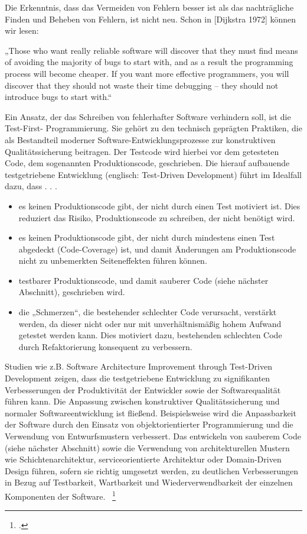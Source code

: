 Die Erkenntnis, dass das Vermeiden von Fehlern besser ist als das nachträgliche Finden
und Beheben von Fehlern, ist nicht neu. Schon in [Dijkstra 1972] können wir lesen:

„Those who want really reliable software will discover that they must find means of
avoiding the majority of bugs to start with, and as a result the programming process
will become cheaper. If you want more effective programmers, you will discover that
they should not waste their time debugging – they should not introduce bugs to start
with.“

Ein Ansatz, der das Schreiben von fehlerhafter Software verhindern soll, ist die Test-First-
Programmierung. Sie gehört zu den technisch geprägten Praktiken, die als Bestandteil moderner 
Software-Entwicklungsprozesse zur konstruktiven Qualitätssicherung beitragen.
Der Testcode wird hierbei vor dem getesteten Code, dem sogenannten Produktionscode,
geschrieben. Die hierauf aufbauende testgetriebene Entwicklung (englisch: Test-Driven
Development) führt im Idealfall dazu, dass . . .
\begin{itemize}
	\item es keinen Produktionscode gibt, der nicht durch einen Test motiviert ist. Dies reduziert das Risiko, Produktionscode zu schreiben, der nicht benötigt wird.

	\item  es keinen Produktionscode gibt, der nicht durch mindestens einen Test abgedeckt (Code-Coverage) ist, und damit Änderungen am Produktionscode nicht zu unbemerkten Seiteneffekten führen können.

	\item testbarer Produktionscode, und damit sauberer Code (siehe nächster Abschnitt), geschrieben wird.

	\item die „Schmerzen“, die bestehender schlechter Code verursacht, verstärkt werden, da dieser nicht oder nur mit unverhältnismäßig hohem Aufwand getestet werden kann. Dies motiviert dazu, bestehenden schlechten Code durch Refaktorierung konsequent zu verbessern.
\end{itemize}

Studien wie z.B. \dq{}Software Architecture Improvement through Test-Driven Development\dq{} zeigen, dass die testgetriebene 
Entwicklung zu signifikanten Verbesserungen der Produktivität der Entwickler sowie der Softwarequalität führen kann. 
Die Anpassung zwischen konstruktiver Qualitätssicherung und normaler Softwareentwicklung ist fließend. Beispielsweise wird die Anpassbarkeit 
der Software durch den Einsatz von objektorientierter Programmierung und die Verwendung von 
Entwurfsmustern verbessert. Das entwickeln von sauberem Code (siehe nächster Abschnitt) sowie die Verwendung 
von architekturellen Mustern wie Schichtenarchitektur, serviceorientierte Architektur oder Domain-Driven Design 
führen, sofern sie richtig umgesetzt werden, zu deutlichen Verbesserungen in Bezug auf Testbarkeit, Wartbarkeit 
und Wiederverwendbarkeit der einzelnen Komponenten der Software. ~\footcite[Vgl.]{Janzen.2006}

